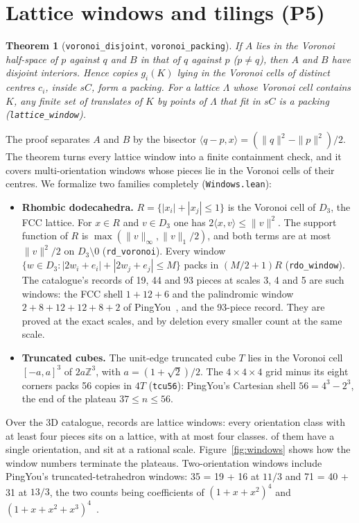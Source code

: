 \documentclass[11pt,a4paper]{article}
\newcommand{\Z}{\mathbb Z}
\newcommand{\code}[1]{\texttt{\nolinkurl{#1}}}
\newcommand{\lean}[1]{\texttt{#1}}
\newtheorem{theorem}{Theorem}
\theoremstyle{definition}
\theoremstyle{remark}
\begin{document}
\section{Lattice windows and tilings (P5)}\label{sec:windows}

\begin{theorem}[\lean{voronoi\_disjoint}, \lean{voronoi\_packing}]
If $A$ lies in the Voronoi half-space of $p$ against $q$ and $B$ in that of $q$ against $p$ ($p\ne q$), then $A$ and $B$ have disjoint interiors. Hence copies $g_i(K)$ lying in the Voronoi cells of distinct centres $c_i$, inside $sC$, form a packing. For a lattice $\Lambda$ whose Voronoi cell contains $K$, any finite set of translates of $K$ by points of $\Lambda$ that fit in $sC$ is a packing (\lean{lattice\_window}).
\end{theorem}

The proof separates $A$ and $B$ by the bisector $\langle q-p,x\rangle=(\|q\|^2-\|p\|^2)/2$. The theorem turns every lattice window into a finite containment check, and it covers multi-orientation windows whose pieces lie in the Voronoi cells of their centres. We formalize two families completely (\code{Windows.lean}):

\begin{itemize}
\item \textbf{Rhombic dodecahedra.} $R=\{|x_i|+|x_j|\le1\}$ is the Voronoi cell of $D_3$, the FCC lattice. For $x\in R$ and $v\in D_3$ one has $2\langle x,v\rangle\le\|v\|^2$. The support function of $R$ is $\max(\|v\|_\infty,\|v\|_1/2)$, and both terms are at most $\|v\|^2/2$ on $D_3\setminus0$ (\lean{rd\_voronoi}). Every window $\{w\in D_3:|2w_i+e_i|+|2w_j+e_j|\le M\}$ packs in $(M/2+1)R$ (\lean{rdo\_window}). The catalogue's records of 19, 44 and 93 pieces at scales 3, 4 and 5 are such windows: the FCC shell $1+12+6$ and the palindromic window $2+8+12+12+8+2$ of PingYou~\cite{pingSixteen}, and the 93-piece record. They are proved at the exact scales, and by deletion every smaller count at the same scale.
\item \textbf{Truncated cubes.} The unit-edge truncated cube $T$ lies in the Voronoi cell $[-a,a]^3$ of $2a\Z^3$, with $a=(1+\sqrt2)/2$. The $4\times4\times4$ grid minus its eight corners packs 56 copies in $4T$ (\lean{tcu56}): PingYou's Cartesian shell $56=4^3-2^3$, the end of the plateau $37\le n\le56$.
\end{itemize}

Over the 3D catalogue, \nLattice{} records are lattice windows: every orientation class with at least four pieces sits on a lattice, with at most four classes. \nLatticeOne{} of them have a single orientation, and \nLatticeRational{} sit at a rational scale. Figure~\ref{fig:windows} shows how the window numbers terminate the plateaus. Two-orientation windows include PingYou's truncated-tetrahedron windows: 35 = 19 + 16 at $11/3$ and 71 = 40 + 31 at $13/3$, the two counts being coefficients of $(1+x+x^2)^4$ and $(1+x+x^2+x^3)^4$~\cite{pingSixteen}.
\end{document}
